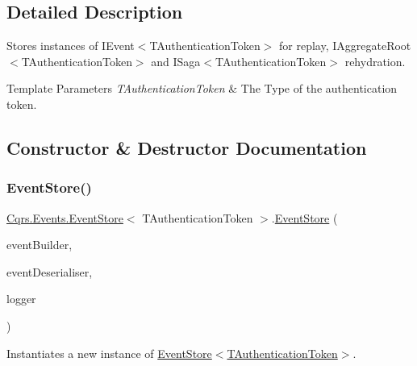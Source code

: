 \subsection{Detailed Description}
Stores instances of I\+Event$<$\+T\+Authentication\+Token$>$ for replay, I\+Aggregate\+Root$<$\+T\+Authentication\+Token$>$ and I\+Saga$<$\+T\+Authentication\+Token$>$ rehydration. 


\begin{DoxyTemplParams}{Template Parameters}
{\em T\+Authentication\+Token} & The Type of the authentication token.\\
\hline
\end{DoxyTemplParams}


\subsection{Constructor \& Destructor Documentation}
\mbox{\label{classCqrs_1_1Events_1_1EventStore_a6346cb2aea4c5b4e740dc6cfb15abab8_a6346cb2aea4c5b4e740dc6cfb15abab8}} 
\subsubsection{\texorpdfstring{Event\+Store()}{EventStore()}}
{\footnotesize\ttfamily \hyperlink{classCqrs_1_1Events_1_1EventStore}{Cqrs.\+Events.\+Event\+Store}$<$ T\+Authentication\+Token $>$.\hyperlink{classCqrs_1_1Events_1_1EventStore}{Event\+Store} (\begin{DoxyParamCaption}\item[{\hyperlink{interfaceCqrs_1_1Events_1_1IEventBuilder}{I\+Event\+Builder}$<$ T\+Authentication\+Token $>$}]{event\+Builder,  }\item[{\hyperlink{interfaceCqrs_1_1Events_1_1IEventDeserialiser}{I\+Event\+Deserialiser}$<$ T\+Authentication\+Token $>$}]{event\+Deserialiser,  }\item[{I\+Logger}]{logger }\end{DoxyParamCaption})\hspace{0.3cm}{\ttfamily [protected]}}



Instantiates a new instance of \hyperlink{classCqrs_1_1Events_1_1EventStore_a6346cb2aea4c5b4e740dc6cfb15abab8_a6346cb2aea4c5b4e740dc6cfb15abab8}{Event\+Store$<$\+T\+Authentication\+Token$>$}. 



